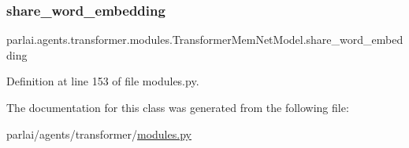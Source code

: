 \subsubsection{\texorpdfstring{share\+\_\+word\+\_\+embedding}{share\_word\_embedding}}
{\footnotesize\ttfamily parlai.\+agents.\+transformer.\+modules.\+Transformer\+Mem\+Net\+Model.\+share\+\_\+word\+\_\+embedding}



Definition at line 153 of file modules.\+py.



The documentation for this class was generated from the following file\+:\begin{DoxyCompactItemize}
\item 
parlai/agents/transformer/\hyperlink{parlai_2agents_2transformer_2modules_8py}{modules.\+py}\end{DoxyCompactItemize}
